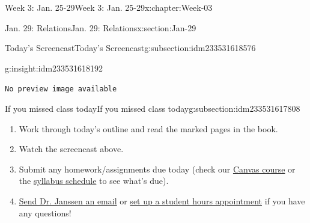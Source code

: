 \documentclass[oneside,10pt,]{book}
\newcommand{\mono}[1]{\texttt{#1}}
\numberwithin{equation}{section}
\newlength{\qrsize}
\newlength{\previewwidth}
\begin{document}
\begin{chapterptx}{Week 3: Jan. 25-29}{}{Week 3: Jan. 25-29}{}{}{x:chapter:Week-03}
\begin{sectionptx}{Jan. 29: Relations}{}{Jan. 29: Relations}{}{}{x:section:Jan-29}
\begin{subsectionptx}{Today's Screencast}{}{Today's Screencast}{}{}{g:subsection:idm233531618576}
\begin{insight}{}{g:insight:idm233531618192}
\setlength{\previewwidth}{\linewidth}
\addtolength{\previewwidth}{-\qrsize}
\begin{tcbraster}[raster columns=2, raster column skip=1pt, raster halign=center, raster force size=false, raster left skip=0pt, raster right skip=0pt]%
\begin{tcolorbox}[previewstyle, width=\previewwidth]%
\mono{No preview image available}%
\end{tcolorbox}%
\begin{tcolorbox}[qrstyle]%
[QR LINK]\end{tcolorbox}%
\end{tcbraster}%
\end{insight}
\end{subsectionptx}
%
%
\typeout{************************************************}
\typeout{************************************************}
%
\begin{subsectionptx}{If you missed class today}{}{If you missed class today}{}{}{g:subsection:idm233531617808}
%
\begin{enumerate}
\item{}Work through today's outline and read the marked pages in the book.%
\item{}Watch the screencast above.%
\item{}Submit any homework\slash{}assignments due today (check our \href{https://dordt.instructure.com/courses/3110050}{Canvas course} or the \href{https://prof.mkjanssen.org/ds/index.html\#schedule}{syllabus schedule} to see what's due).%
\item{}\href{mailto:mike.janssen@dordt.edu}{Send Dr. Janssen an email} or \href{https://calendly.com/mkjanssen/student-hours}{set up a student hours appointment} if you have any questions!%
\end{enumerate}
\end{subsectionptx}
\end{sectionptx}
\end{chapterptx}
%
%
\typeout{************************************************}
\typeout{************************************************}
%
\end{document}
